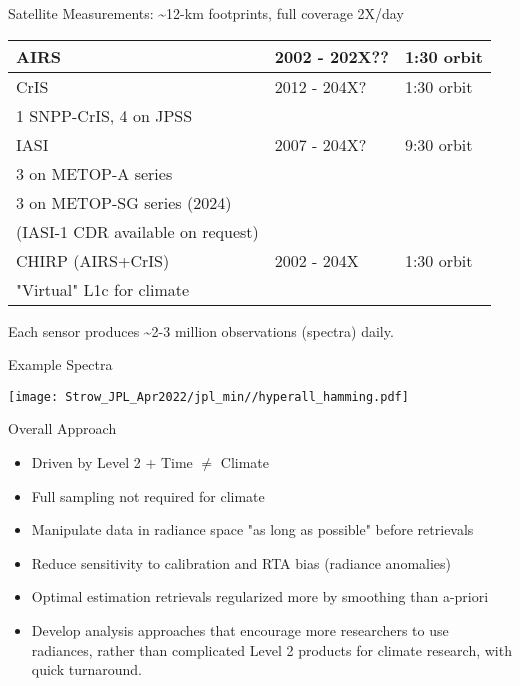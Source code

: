 \documentclass[10pt,t]{beamer}
\begin{document}
\begin{frame}[label={sec:orgfe24b29}]{Satellite Measurements: \small \textasciitilde{}12-km footprints, full coverage 2X/day}
\begin{center}
\begin{tabular}{lll}
AIRS & 2002 - 202X?? & 1:30 orbit\\
\hline
CrIS & 2012 - 204X? & 1:30 orbit\\
\small 1 SNPP-CrIS, 4 on JPSS &  & \\
\hline
IASI & 2007 - 204X? & 9:30 orbit\\
\small 3 on METOP-A series &  & \\
\small 3 on METOP-SG series (2024) &  & \\
\small(IASI-1 CDR available on request) &  & \\
\hline
CHIRP (AIRS+CrIS) & 2002 - 204X & 1:30 orbit\\
\small "Virtual" L1c for climate &  & \\
\end{tabular}
\end{center}

Each sensor produces \textasciitilde{}2-3 million observations (spectra) daily. \\
\vspace{0.1in}
\end{frame}

\begin{frame}[label={sec:orga727ef9}]{Example Spectra}
\begin{center}
\texttt{[image: Strow\_JPL\_Apr2022/jpl\_min//hyperall\_hamming.pdf]}
\end{center}
\end{frame}

\begin{frame}[label={sec:org409554b}]{Overall Approach}
\begin{itemize}
\item Driven by Level 2 + Time \(\neq\) Climate
\item Full sampling not required for climate
\item Manipulate data in radiance space "as long as possible" before retrievals
\item Reduce sensitivity to calibration and RTA bias (radiance anomalies)
\item Optimal estimation retrievals regularized more by smoothing than a-priori
\item Develop analysis approaches that encourage more researchers to use radiances, rather than complicated Level 2 products for climate research, with quick turnaround.
\end{itemize}
\end{frame}
\end{document}
